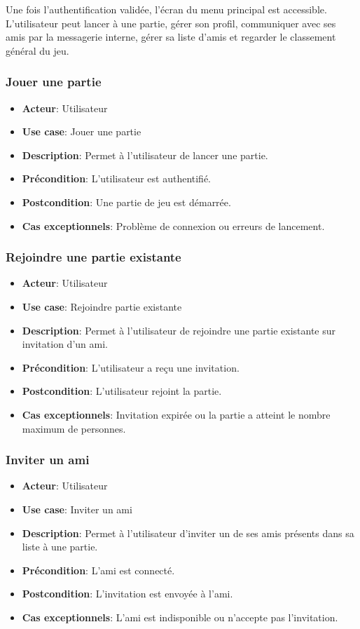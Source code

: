 \documentclass{article}
\begin{document}
Une fois l'authentification validée, l'écran du menu principal est accessible. L'utilisateur peut lancer à une partie, gérer son profil, communiquer avec ses amis par la messagerie interne, gérer sa liste d'amis et regarder le classement général du jeu.

\subsubsection*{Jouer une partie}
\begin{itemize}
    \item \textbf{Acteur}: Utilisateur
    \item \textbf{Use case}: Jouer une partie
    \item \textbf{Description}: Permet à l'utilisateur de lancer une partie.
    \item \textbf{Précondition}: L'utilisateur est authentifié.
    \item \textbf{Postcondition}: Une partie de jeu est démarrée.
    \item \textbf{Cas exceptionnels}: Problème de connexion ou erreurs de lancement.
\end{itemize}

\subsubsection*{Rejoindre une partie existante}
\begin{itemize}
    \item \textbf{Acteur}: Utilisateur
    \item \textbf{Use case}: Rejoindre partie existante
    \item \textbf{Description}: Permet à l'utilisateur de rejoindre une partie existante sur invitation d'un ami.
    \item \textbf{Précondition}: L'utilisateur a reçu une invitation.
    \item \textbf{Postcondition}: L'utilisateur rejoint la partie.
    \item \textbf{Cas exceptionnels}: Invitation expirée ou la partie a atteint le nombre maximum de personnes.
\end{itemize}

\subsubsection*{Inviter un ami}
\begin{itemize}
    \item \textbf{Acteur}: Utilisateur
    \item \textbf{Use case}: Inviter un ami
    \item \textbf{Description}: Permet à l'utilisateur d'inviter un de ses amis présents dans sa liste à une partie.
    \item \textbf{Précondition}: L'ami est connecté.
    \item \textbf{Postcondition}: L'invitation est envoyée à l'ami.
    \item \textbf{Cas exceptionnels}: L'ami est indisponible ou n'accepte pas l'invitation.
\end{itemize}
\end{document}
